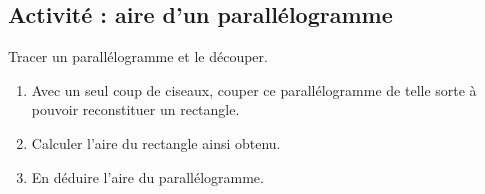 
\subsection{Activité : aire d'un parallélogramme}

Tracer un parallélogramme et le découper.
\begin{enumerate}
    \item
        Avec un seul coup de ciseaux, couper ce parallélogramme de telle sorte à pouvoir reconstituer un rectangle.
    \item
        Calculer l'aire du rectangle ainsi obtenu.
    \item
        En déduire l'aire du parallélogramme.
\end{enumerate}
